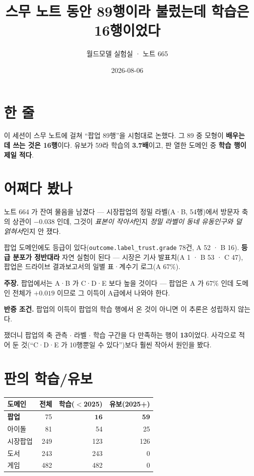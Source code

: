 \documentclass[10pt,a4paper]{article}
\title{\bfseries 스무 노트 동안 89행이라 불렀는데 학습은 16행이었다}
\author{월드모델 실험실 · 노트 665}
\date{2026-08-06}
\newcommand{\claim}[2]{\begin{claimbox}\textbf{주장.} #1\par\smallskip
  \textcolor{gray!70}{\textbf{반증 조건.} #2}\end{claimbox}}
\begin{document}
\maketitle

\section{한 줄}

이 세션이 스무 노트에 걸쳐 ``팝업 89행''을 시험대로 논했다. 그 89 중 모형이
\textbf{배우는 데 쓰는 것은 16행}이다. 유보가 59라 학습의 \textbf{3.7배}이고,
판 열한 도메인 중 \textbf{학습 행이 제일 적다}.

\section{어쩌다 봤나}

노트 664 가 잔여 물음을 남겼다 --- 시장팝업의 정밀 라벨(A·B, 54행)에서 방문자
축의 상관이 $-0.038$ 인데, 그것이 \emph{표본이 작아서}인지 \emph{정밀 라벨이
동네 유동인구와 덜 얽혀서}인지 안 쟀다.

팝업 도메인에도 등급이 있다(\verb|outcome.label_trust.grade| 78건, A 52 · B 16).
\textbf{등급 분포가 정반대라} 자연 실험이 된다 --- 시장은 기사 발표치(A 1 · B 53 ·
C 47), 팝업은 드라이브 결과보고서의 일별 표·계수기 로그(A 67\%).

\claim{팝업에서는 A·B 가 C·D·E 보다 높을 것이다 --- 팝업은 A 가 67\% 인데 도메인
전체가 $+0.019$ 이므로 그 이득이 A급에서 나와야 한다.}{팝업의 이득이 팝업의
학습 행에서 온 것이 아니면 이 추론은 성립하지 않는다.}

쟀더니 팝업의 축 관측 $\cdot$ 라벨 $\cdot$ 학습 구간을 다 만족하는 행이
\textbf{13}이었다. 사각으로 적어 둔 것(``C·D·E 가 10행뿐일 수 있다'')보다 훨씬
작아서 원인을 봤다.

\section{판의 학습/유보}

\begin{center}\small
\begin{tabular}{lrrr}\toprule
도메인 & 전체 & 학습($<$2025) & 유보(2025+) \\ \midrule
\textbf{팝업} & 75 & $\mathbf{16}$ & $\mathbf{59}$ \\
아이돌 & 81 & 54 & 25 \\
시장팝업 & 249 & 123 & 126 \\
도서 & 243 & 243 & 0 \\
게임 & 482 & 482 & 0 \\ \bottomrule
\end{tabular}\end{center}
\end{document}

